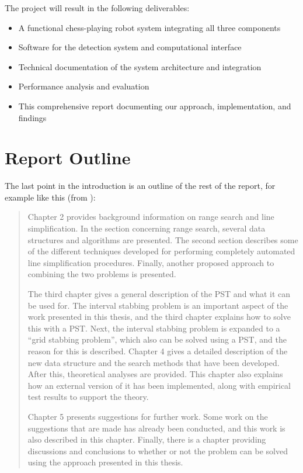 The project will result in the following deliverables:
\begin{itemize}
  \item A functional chess-playing robot system integrating all three components
  \item Software for the detection system and computational interface
  \item Technical documentation of the system architecture and integration
  \item Performance analysis and evaluation
  \item This comprehensive report documenting our approach, implementation, and findings
\end{itemize}

\section{Report Outline}
\label{sec:outline}

The last point in the introduction is an outline of the rest of the report, for example like this (from \cite{kjeldsen05cor}):

\begin{quotation}
  Chapter 2 provides background information on range search and line simplification. In the section concerning range search, several data structures and algorithms are presented. The second section describes some of the different techniques developed for performing completely automated line simplification procedures. Finally, another proposed approach to combining the two problems is presented.

  The third chapter gives a general description of the PST and what it can be used for. The interval
  stabbing problem is an important aspect of the work presented in this thesis, and the third chapter
  explains how to solve this with a PST. Next, the interval stabbing problem is expanded to a ``grid
  stabbing problem”, which also can be solved using a PST, and the reason for this is described. Chapter 4 gives a detailed description of the new data structure and the search methods that
  have been developed. After this, theoretical analyses are provided. This chapter also explains how
  an external version of it has been implemented, along with empirical test results to support the theory.

  Chapter 5 presents suggestions for further work. Some work on the suggestions that are made has already been conducted, and this work is also described in this chapter. Finally, there is a chapter providing discussions and conclusions to whether or not the problem can be solved using the approach presented in this thesis.
\end{quotation}

